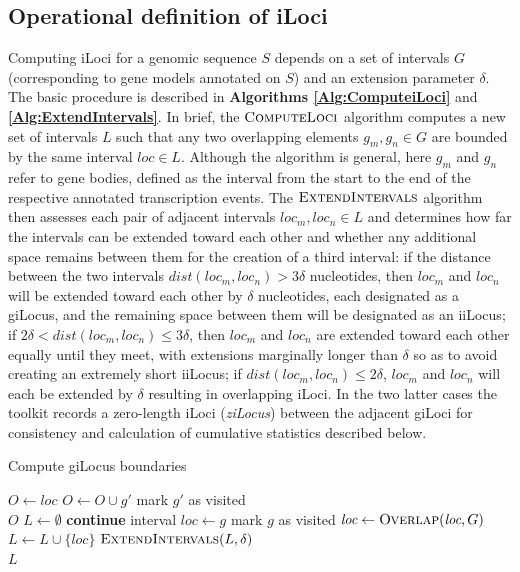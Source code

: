 \subsection{Operational definition of iLoci}
Computing iLoci for a genomic sequence $S$ depends on a set of intervals $G$ (corresponding to gene models annotated on $S$) and an extension parameter $\delta$.
The basic procedure is described in \textbf{Algorithms \ref{Alg:ComputeiLoci}} and \textbf{\ref{Alg:ExtendIntervals}}.
In brief, the $\textsc{ComputeLoci}$ algorithm computes a new set of intervals $L$ such that any two overlapping elements $g_m, g_n \in G$ are bounded by the same interval $loc \in L$.
Although the algorithm is general, here $g_m$ and $g_n$ refer to gene bodies, defined as the interval from the start to the end of the respective annotated transcription events.
The $\textsc{ExtendIntervals}$ algorithm then assesses each pair of adjacent intervals $loc_m, loc_n \in L$ and determines how far the intervals can be extended toward each other and whether any additional space remains between them for the creation of a third interval:
if the distance between the two intervals $dist(loc_m, loc_n) > 3 \delta$ nucleotides, then $loc_m$ and $loc_n$ will be extended toward each other by $\delta$ nucleotides, each designated as a giLocus, and the remaining space between them will be designated as an iiLocus;
if $2\delta < dist(loc_m, loc_n) \leq 3\delta$, then $loc_m$ and $loc_n$ are extended toward each other equally until they meet, with extensions marginally longer than $\delta$ so as to avoid creating an extremely short iiLocus;
if $dist(loc_m, loc_n) \leq 2\delta$, $loc_m$ and $loc_n$ will each be extended by $\delta$ resulting in overlapping iLoci.
In the two latter cases the toolkit records a zero-length iLoci (\textit{ziLocus}) between the adjacent giLoci for consistency and calculation of cumulative statistics described below.

\begin{algorithm}
\caption{Compute giLocus boundaries}
\label{Alg:ComputeiLoci}
\begin{algorithmic}[1]
\State $O \gets loc$
        \State $O \gets O \cup g'$
        \State mark $g'$ as visited
    \EndIf
\EndFor \\
\Return $O$
\EndProcedure
{}
\State $L \gets \emptyset$
        \State \textbf{continue}
    \EndIf
    \State interval $\textit{loc} \gets g$
    \State mark $g$ as visited
        \State $\textit{loc} \gets \textsc{Overlap}(\textit{loc}, G)$
    \EndWhile
    \State $L \gets L \cup \{\textit{loc}\}$
\EndFor
\State $\textsc{ExtendIntervals}(L, \delta)$ \\
\Return $L$
\EndProcedure
\end{algorithmic}
\end{algorithm}


